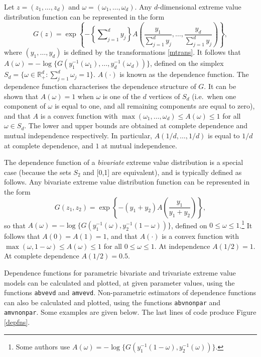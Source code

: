 \documentclass[11pt,a4paper]{article}
\begin{document}
Let $z=(z_1,\dots,z_d)$ and $\omega=(\omega_1,\dots,\omega_d)$. Any $d$-dimensional extreme value distribution function can be represented in the form
\begin{equation*}
G(z) = \exp\left\{ - \left\{\sum\nolimits_{j=1}^d y_j \right\} A\left(\frac{y_1}{\sum\nolimits_{j=1}^d y_j}, \dots, \frac{y_d}{\sum\nolimits_{j=1}^d y_j} \right)\right\},
\end{equation*}
where $(y_1,\dots,y_d)$ is defined by the transformations \eqref{mtrans}. It follows that $A(\omega)=-\log\{G(y_1^{-1}(\omega_1),\dots,y_d^{-1}(\omega_d))\}$, defined on the simplex $S_d =\{\omega \in \mathbb{R}^d_+: \sum_{j=1}^d \omega_j = 1\}$. 
$A(\cdot)$ is known as the dependence function. The dependence function characterises the dependence structure of $G$.
It can be shown that $A(\omega)=1$ when $\omega$ is one of the $d$ vertices of $S_d$ (i.e.\ when one component of $\omega$ is equal to one, and all remaining components are equal to zero), and that $A$ is a convex function with $\max(\omega_1,\dots,\omega_d) \leq A(\omega) \leq 1$ for all $\omega \in S_d$.
The lower and upper bounds are obtained at complete dependence and mutual independence respectively. 
In particular, $A(1/d,\dots,1/d)$ is equal to $1/d$ at complete dependence, and $1$ at mutual independence.  

The dependence function of a \emph{bivariate} extreme value distribution is a special case (because the sets $S_2$ and [0,1] are equivalent), and is typically defined as follows.
Any bivariate extreme value distribution function can be represented in the form
\begin{equation}
G(z_1,z_2) = \exp\left\{ - (y_1 + y_2)A\left(\frac{y_1}{y_1+y_2}\right)\right\},
\label{bvdepfn}
\end{equation}
so that $A(\omega)=-\log\{G(y_1^{-1}(\omega),y_2^{-1}(1-\omega))\}$, defined on
$0\leq\omega\leq1$.\footnote{Some authors \citep[e.g.][]{pick81} use $A(\omega)=-\log\{G(y_1^{-1}(1-\omega),y_2^{-1}(\omega))\}$.}
It follows that $A(0)=A(1)=1$, and that $A(\cdot)$ is a convex function with $\max(\omega,1-\omega) \leq A(\omega) \leq 1$ for all $0\leq\omega\leq1$. 
At independence $A(1/2) = 1$.
At complete dependence $A(1/2) = 0.5$. 

Dependence functions for parametric bivariate and trivariate extreme value models can be calculated and plotted, at given parameter values, using the functions \verb+abvevd+ and \verb+amvevd+. 
Non-parametric estimators of dependence functions can also be calculated and plotted, using the functions \verb+abvnonpar+ and \verb+amvnonpar+.
Some examples are given below.
The last lines of code produce Figure \ref{depfns}.
\end{document}
